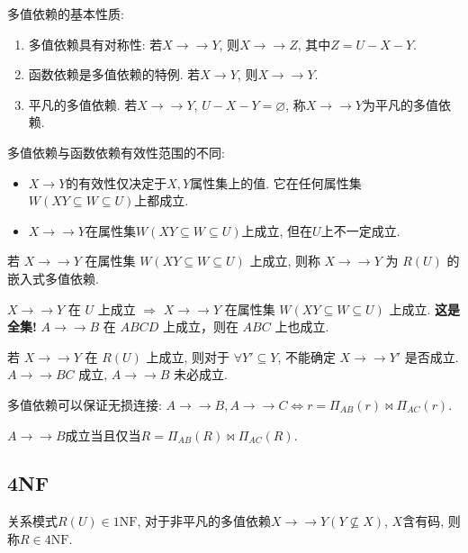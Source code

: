 多值依赖的基本性质:
\begin{enumerate}
    \item 多值依赖具有对称性: 若$X\to\to Y$, 则$X\to\to Z$, 其中$Z=U-X-Y$.
    \item 函数依赖是多值依赖的特例. 若$X\to Y$, 则$X\to\to Y$.
    \item 平凡的多值依赖. 若$X\to\to Y$, $U-X-Y=\varnothing$, 称$X\to\to Y$为平凡的多值依赖.
\end{enumerate}

多值依赖与函数依赖有效性范围的不同:
\begin{itemize}
  \item $X\to Y$的有效性仅决定于$X,Y$属性集上的值. 它在任何属性集$W(XY\subseteq W\subseteq U)$上都成立.
  \item $X\to\to Y$在属性集$W(XY\subseteq W\subseteq U)$上成立, 但在$U$上不一定成立.
\end{itemize}

\begin{definition}[嵌入式多值依赖]
  若 $X \to\to Y$ 在属性集 $W (XY \subseteq W \subseteq U)$ 上成立,
则称 $X \to\to Y$ 为 $R(U)$ 的嵌入式多值依赖.
\end{definition}

\begin{remark}
  $X \to\to Y$ 在 $U$ 上成立 $\Rightarrow$ $X \to\to Y$ 在属性集 $W (XY \subseteq W \subseteq U)$ 上成立. \textbf{这是全集!} $A \to\to B$ 在 $ABCD$ 上成立，则在 $ABC$ 上也成立.

  若 $X \to\to Y$ 在 $R(U)$ 上成立,
  则对于 $\forall Y' \subseteq Y$, 不能确定 $X \to\to Y'$ 是否成立.
  $A \to\to BC$ 成立, $A \to\to B$ 未必成立.
\end{remark}


多值依赖可以保证无损连接: $A\to\to B,A\to\to C \Leftrightarrow r = \Pi_{AB}(r) \bowtie \Pi_{AC}(r)$.

\begin{theorem}[多值依赖成立]
  $A\to\to B$成立当且仅当$R = \Pi_{AB}(R) \bowtie \Pi_{AC}(R)$.
\end{theorem}

\subsection{4NF}

\begin{definition}[4NF]
  关系模式$R(U)\in \text{1NF}$, 对于非平凡的多值依赖$X\to\to Y (Y\nsubseteq X)$, $X$含有码, 则称$R\in\text{4NF}$.
\end{definition}

